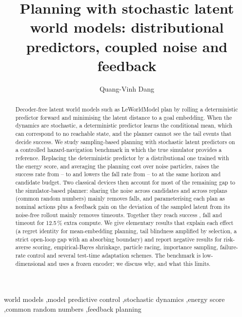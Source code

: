 \documentclass[preprint,12pt]{elsarticle}
\providecommand{\detSucc}{--}\providecommand{\detFall}{--}\providecommand{\detTime}{--}\providecommand{\detN}{--}
\begin{document}
\begin{frontmatter}

\title{Planning with stochastic latent world models: distributional predictors, coupled noise and feedback}

\author[buv]{Quang-Vinh Dang}
\address[buv]{British University Vietnam, Hung Yen, Vietnam}

\begin{abstract}
Decoder-free latent world models such as LeWorldModel plan by rolling a deterministic predictor forward and minimising the latent distance to a goal embedding.
When the dynamics are stochastic, a deterministic predictor learns the conditional mean, which can correspond to no reachable state, and the planner cannot see the tail events that decide success.
We study sampling-based planning with stochastic latent predictors on a controlled hazard-navigation benchmark in which the true simulator provides a reference.
Replacing the deterministic predictor by a distributional one trained with the energy score, and averaging the planning cost over noise particles, raises the success rate from \detSucc{} to \esolSucc{} and lowers the fall rate from \detFall{} to \esolFall{} at the same horizon and candidate budget.
Two classical devices then account for most of the remaining gap to the simulator-based planner: sharing the noise across candidates and across replans (common random numbers) mainly removes falls, and parameterising each plan as nominal actions plus a feedback gain on the deviation of the sampled latent from its noise-free rollout mainly removes timeouts.
Together they reach success \esfbcrnSucc{}, fall \esfbcrnFall{} and timeout \esfbcrnTime{} for 12.5\,\% extra compute.
We give elementary results that explain each effect (a regret identity for mean-embedding planning, tail blindness amplified by selection, a strict open-loop gap with an absorbing boundary) and report negative results for risk-averse scoring, empirical-Bayes shrinkage, particle racing, importance sampling, failure-rate control and several test-time adaptation schemes.
The benchmark is low-dimensional and uses a frozen encoder; we discuss why, and what this limits.
\end{abstract}

\begin{keyword}
world models \sep model predictive control \sep stochastic dynamics \sep energy score \sep common random numbers \sep feedback planning
\end{keyword}
\end{frontmatter}
\end{document}
